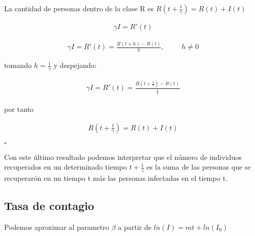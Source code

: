 \begin{Af}
La cantidad de personas dentro de la clase R es $R(t+\frac{1}{\gamma}) = R(t) + I(t)$
\end{Af}

\begin{Dem}
\begin{align*}
\gamma I = R'(t)
\end{align*}

\begin{align*}
\gamma I = R'(t) = \frac{R\left( t + h \right) - R\left(t\right)}{h}, \hspace{1cm} h \neq 0
\end{align*}

tomando $h = \frac{1}{\gamma}$ y despejando: 

\begin{align*}
\gamma I = R'(t) = \frac{R\left( t + \frac{1}{\gamma} \right) - R\left(t\right)}{\frac{1}{\gamma}}
\end{align*}

por tanto

\begin{align*}
R\left( t + \frac{1}{\gamma} \right) = R(t) + I(t)
\end{align*}

\hfill	$\square$
\end{Dem}

Con este último resultado podemos interpretar que el número de individuos recuperados en un determinado tiempo $t + \frac {1}{\gamma}$  es la suma de las personas que se recuperarón en un tiempo t más las personas infectadas en el tiempo t.

\subsection{\textbf{Tasa de contagio}}

\begin{Af}
Podemos aproximar al parametro $\beta$ a partir de $ln(I) = mt + ln(I_{0})$\cite{Algeria}
\end{Af}


